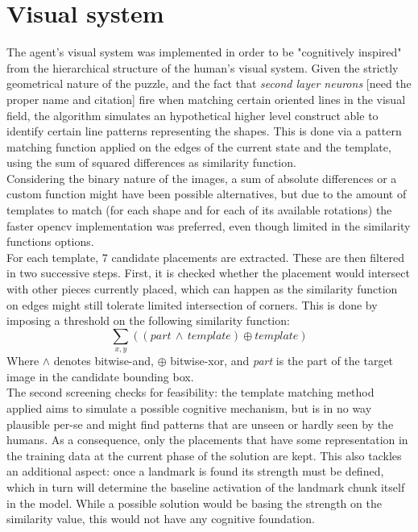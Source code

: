 \documentclass[a4paper,singleside,12pt]{report} %
\begin{document}
    \section{Visual system}
    The agent's visual system was implemented in order to be "cognitively inspired" from the hierarchical structure of the human's visual system. Given the strictly geometrical nature of the puzzle, and the fact that \textit{second layer neurons} [need the proper name and citation] fire when matching certain oriented lines in the visual field, the algorithm simulates an hypothetical higher level construct able to identify certain line patterns representing the shapes. This is done via a pattern matching function applied on the edges of the current state and the template, using the sum of squared differences as similarity function. \\ Considering the binary nature of the images, a sum of absolute differences or a custom function might have been possible alternatives, but due to the amount of templates to match (for each shape and for each of its available rotations) the faster opencv implementation was preferred, even though limited in the similarity functions options.\\
    For each template, 7 candidate placements are extracted. These are then filtered in two successive steps. First, it is checked whether the placement would intersect with other pieces currently placed, which can happen as the similarity function on edges might still tolerate limited intersection of corners. This is done by imposing a threshold on the following similarity function:
    \begin{equation}
        \sum_{x,y}((part\, \wedge \,template) \oplus template)
    \end{equation}
    Where \textit{$\wedge$} denotes bitwise-and, \textit{$\oplus$} bitwise-xor, and \textit{part} is the part of the target image in the candidate bounding box.\\
    The second screening checks for feasibility: the template matching method applied aims to simulate a possible cognitive mechanism, but is in no way plausible per-se and might find patterns that are unseen or hardly seen by the humans. As a consequence, only the placements that have some representation in the training data at the current phase of the solution are kept. This also tackles an additional aspect: once a landmark is found its strength must be defined, which in turn will determine the baseline activation of the landmark chunk itself in the model. While a possible solution would be basing the strength on the similarity value, this would not have any cognitive foundation. 
\end{document}
